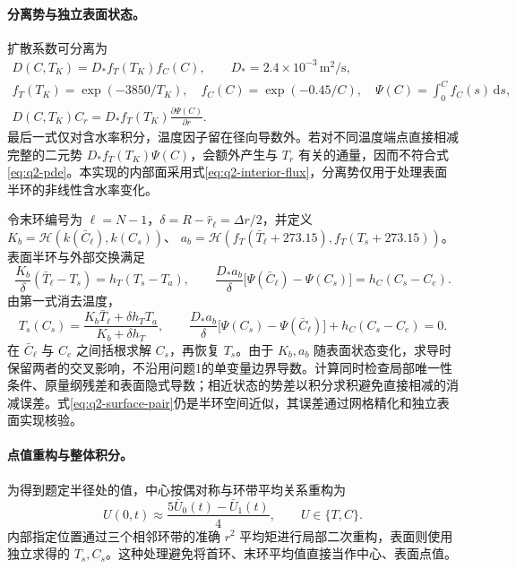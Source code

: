 \paragraph{分离势与独立表面状态。}
扩散系数可分离为
\begin{equation}
\begin{gathered}
D(C,T_K)=D_*f_T(T_K)f_C(C),\qquad D_*=2.4\times10^{-3}\,\mathrm{m^2/s},\\
f_T(T_K)=\exp(-3850/T_K),\quad f_C(C)=\exp(-0.45/C),\quad
\Psi(C)=\int_0^C f_C(s)\,\mathrm ds,\\
D(C,T_K)C_r=D_*f_T(T_K)\frac{\partial\Psi(C)}{\partial r}.
\end{gathered}
\label{eq:q2-separated-potential}
\end{equation}
最后一式仅对含水率积分，温度因子留在径向导数外。若对不同温度端点直接相减完整的二元势
\(D_*f_T(T_K)\Psi(C)\)，会额外产生与 \(T_r\) 有关的通量，因而不符合式\eqref{eq:q2-pde}。本实现的内部面采用式\eqref{eq:q2-interior-flux}，分离势仅用于处理表面半环的非线性含水率变化。

令末环编号为 \(\ell=N-1\)，\(\delta=R-\widehat r_\ell=\Delta r/2\)，并定义
\(K_b=\mathcal H(k(\bar C_\ell),k(C_s))\)、
\(a_b=\mathcal H(f_T(\bar T_\ell+273.15),f_T(T_s+273.15))\)。
表面半环与外部交换满足
\begin{equation}
\frac{K_b}{\delta}(\bar T_\ell-T_s)=h_T(T_s-T_a),\qquad
\frac{D_*a_b}{\delta}\bigl[\Psi(\bar C_\ell)-\Psi(C_s)\bigr]
=h_C(C_s-C_e).
\label{eq:q2-surface-pair}
\end{equation}
由第一式消去温度，
\begin{equation}
T_s(C_s)=\frac{K_b\bar T_\ell+\delta h_TT_a}{K_b+\delta h_T},\qquad
\frac{D_*a_b}{\delta}\bigl[\Psi(C_s)-\Psi(\bar C_\ell)\bigr]
+h_C(C_s-C_e)=0 .
\label{eq:q2-surface-root}
\end{equation}
在 \(\bar C_\ell\) 与 \(C_e\) 之间括根求解 \(C_s\)，再恢复 \(T_s\)。由于 \(K_b,a_b\) 随表面状态变化，求导时保留两者的交叉影响，不沿用问题1的单变量边界导数。计算同时检查局部唯一性条件、原量纲残差和表面隐式导数；相近状态的势差以积分求积避免直接相减的消减误差。式\eqref{eq:q2-surface-pair}仍是半环空间近似，其误差通过网格精化和独立表面实现核验。

\paragraph{点值重构与整体积分。}
为得到题定半径处的值，中心按偶对称与环带平均关系重构为
\begin{equation}
U(0,t)\approx\frac{5\bar U_0(t)-\bar U_1(t)}{4},
\qquad U\in\{T,C\}.
\label{eq:q2-centre-output}
\end{equation}
内部指定位置通过三个相邻环带的准确 \(r^2\) 平均矩进行局部二次重构，表面则使用独立求得的 \(T_s,C_s\)。这种处理避免将首环、末环平均值直接当作中心、表面点值。

